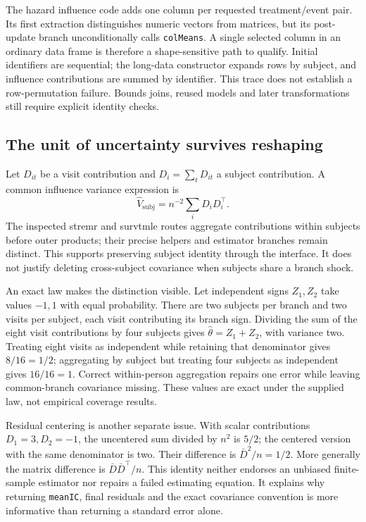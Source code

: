 The hazard influence code adds one column per requested treatment/event pair.
Its first extraction distinguishes numeric vectors from matrices, but its
post-update branch unconditionally calls \texttt{colMeans}. A single selected
column in an ordinary data frame is therefore a shape-sensitive path to
qualify. Initial identifiers are sequential; the long-data constructor expands
rows by subject, and influence contributions are summed by identifier. This
trace does not establish a row-permutation failure. Bounds joins, reused
models and later transformations still require explicit identity checks.
\citep{exec23_longr_survtmle}

\subsection{The unit of uncertainty survives reshaping}
\label{eq:exec23-longr-variance}
Let $D_{it}$ be a visit contribution and $D_i=\sum_t D_{it}$ a subject
contribution. A common influence variance expression is
\[
 \widehat V_{\mathrm{subj}}=n^{-2}\sum_i D_iD_i^\top.
\]
The inspected stremr and survtmle routes aggregate contributions within
subjects before outer products; their precise helpers and estimator branches
remain distinct. This supports preserving subject identity through the
interface. It does not justify deleting cross-subject covariance when subjects
share a branch shock. \citep{exec23_longr_stremr,exec23_longr_survtmle}

An exact law makes the distinction visible. Let independent signs $Z_1,Z_2$
take values $-1,1$ with equal probability. There are two subjects per branch
and two visits per subject, each visit contributing its branch sign. Dividing
the sum of the eight visit contributions by four subjects gives
$\widehat\theta=Z_1+Z_2$, with variance two. Treating eight visits as independent
while retaining that denominator gives $8/16=1/2$; aggregating by subject but
treating four subjects as independent gives $16/16=1$. Correct within-person
aggregation repairs one error while leaving common-branch covariance missing.
These values are exact under the supplied law, not empirical coverage results.
\citep{exec23_longr_reference}

Residual centering is another separate issue. With scalar contributions
$D_1=3,D_2=-1$, the uncentered sum divided by $n^2$ is $5/2$; the centered
version with the same denominator is two. Their difference is
$\bar D^2/n=1/2$. More generally the matrix difference is
$\bar D\bar D^\top/n$. This identity neither endorses an unbiased finite-sample
estimator nor repairs a failed estimating equation. It explains why returning
\texttt{meanIC}, final residuals and the exact covariance convention is more
informative than returning a standard error alone. \citep{exec23_longr_reference}

